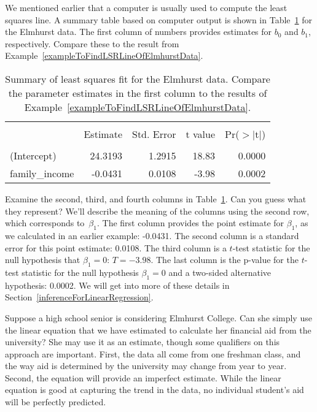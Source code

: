 We mentioned earlier that a computer is usually used to compute the least squares line. A summary table based on computer output is shown in Table~\ref{rOutputForIncomeAidLSRLine} for the Elmhurst data. The first column of numbers provides estimates for ${b}_0$ and ${b}_1$, respectively. Compare these to the result from Example~\ref{exampleToFindLSRLineOfElmhurstData}.

\begin{table}[ht]
\centering
\begin{tabular}{l rrrr}
  \hline
  \vspace{-3.7mm} & & & & \\
 & Estimate & Std. Error & t value & Pr($>$$|$t$|$) \\ 
  \hline
  \vspace{-3.6mm} & & & & \\
(Intercept) & 24.3193 & 1.2915 & 18.83 & 0.0000 \\ 
family\_\hspace{0.3mm}income & -0.0431 & 0.0108 & -3.98 & 0.0002 \\ 
  \hline
\end{tabular}
\caption{Summary of least squares fit for the Elmhurst data. Compare the parameter estimates in the first column to the results of Example~\ref{exampleToFindLSRLineOfElmhurstData}.}
\label{rOutputForIncomeAidLSRLine}
\end{table}

\begin{example}{Examine the second, third, and fourth columns in Table~\ref{rOutputForIncomeAidLSRLine}. Can you guess what they represent?}
We'll describe the meaning of the columns using the second row, which corresponds to~$\beta_1$. The first column provides the point estimate for $\beta_1$, as we calculated in an earlier example: -0.0431. The second column is a standard error for this point estimate: 0.0108. The third column is a $t$-test statistic for the null hypothesis that $\beta_1 = 0$: $T=-3.98$. The last column is the p-value for the $t$-test statistic for the null hypothesis $\beta_1=0$ and a two-sided alternative hypothesis: 0.0002. We will get into more of these details in Section~\ref{inferenceForLinearRegression}.
\end{example}

\begin{example}{Suppose a high school senior is considering Elmhurst College. Can she simply use the linear equation that we have estimated to calculate her financial aid from the university?}
She may use it as an estimate, though some qualifiers on this approach are important. First, the data all come from one freshman class, and the way aid is determined by the university may change from year to year. Second, the equation will provide an imperfect estimate. While the linear equation is good at capturing the trend in the data, no individual student's aid will be perfectly predicted.
\end{example} 



